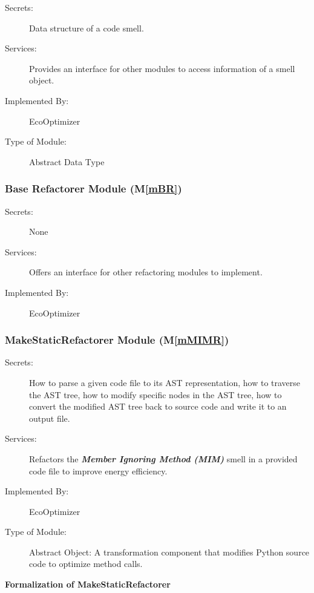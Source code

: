 \documentclass[12pt, titlepage]{article}
\newcommand{\mref}[1]{M\ref{#1}}
\begin{document}
\begin{description}
\item[Secrets:] Data structure of a code smell.
\item[Services:] Provides an interface for other modules to access information of a smell object.
\item[Implemented By:] EcoOptimizer
\item[Type of Module:] Abstract Data Type
\end{description}

\subsubsection{Base Refactorer Module (\mref{mBR})}


\begin{description}
    \item[Secrets:] None
    \item[Services:] Offers an interface for other refactoring modules to implement.
    \item[Implemented By:] EcoOptimizer
\end{description}

\subsubsection{MakeStaticRefactorer Module (\mref{mMIMR})}

\begin{description}
\item[Secrets:] How to parse a given code file to its AST representation, how to traverse the AST tree, how to modify specific nodes in the AST tree, how to convert the modified AST tree back to source code and write it to an output file.
\item[Services:] Refactors the \textit{\textbf{Member Ignoring Method (MIM)}} smell in a provided code file to improve energy efficiency.
\item[Implemented By:] EcoOptimizer
\item[Type of Module:] Abstract Object: A transformation component that modifies Python source code to optimize method calls.
\end{description}

\textbf{Formalization of MakeStaticRefactorer}
\end{document}
